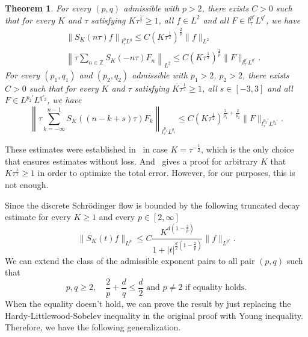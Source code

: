 \documentclass[10pt,a4paper]{article}
\newtheorem{theorem}{Theorem}[section]
\begin{document}
  \begin{theorem}\label{thmDSEold} %
    For every \((p,q)\) admissible with \(p>2\), there exists \(C>0\) such that
    for every \(K\) and \(\tau\) satisfying \(K\tau^\frac12 \geq 1\), all \(
    f \in L^2 \) and all \(F \in l^{p'}_\tau L^{q'}\), we have 
    \begin{eqnarray}
      \label{To} & & \left\| S_{K}(n \tau) f\right\|_{l^p_\tau L^q} \leq C(K\tau^\frac12)^{\frac2p} \|f\|_{L^2} \\
      \label{T*o} & & \left\| \tau\sum_{n \in \mathbb{Z}}  S_K (-n\tau) F_n \right\|_{L^2} \leq C (K\tau^\frac12)^\frac2p \|F\|_{l^{p'}_\tau L^{q'}}.
    \end{eqnarray}
    For every \((p_1, q_1)\) and \((p_2, q_2)\) admissible with \(p_1>2\),
    \(p_2>2\), there exists \(C > 0\) such that for every \(K\) and \(\tau\) 
    satisfying \(K\tau^\frac12 \geq 1\), all \( s \in [-3,3] \) and all 
    \(F \in L^{p_2'} L^{q'_2}\), we have
    \begin{equation}\label{TT*o}
      \left\| \tau \sum_{k = -\infty}^{n-1}  S_K ((n-k+s)\tau) F_k \right\|_{l^{p_1}_\tau L^{q_1}}
      \leq C (K\tau^\frac12)^{ \frac2{p_1} + \frac2{p_2} }  \|F\|_{l^{p_2'}_\tau L^{q_2'}}.
    \end{equation}
  \end{theorem}

  These estimates were established in~\cite{IgZz09} 
  in case \(K=\tau^{-\frac12}\), which is the only choice that ensures estimates 
  without loss. And~\cite{ORS21} gives a proof for arbitrary \(K\) that \(K\tau^\frac12 \geq 1\) 
  in order to optimize the total error. However, for our purposes, this is not enough.

  Since the discrete Schr\"odinger flow is bounded by the following truncated
  decay estimate for every \(K\geq 1\) and every \(p \in [2,\infty]\)
  \[
    \|S_K(t)f\|_{L^p} \leq C \frac{K^{d(1-\frac2p)}}{1+|t|^{\frac{d}2(1-\frac2p)}} \|f\|_{L^{p'}}.
  \]
  We can extend the class of the admissible exponent pairs to all pair \((p,q)\)
  such that 
  \begin{equation}\label{weakly-admissible}
    p,q \geq 2 ,\quad \frac2p + \frac{d}q \leq \frac{d}2 \text{ and } p \neq 2 \text{ if
    equality holds.}
  \end{equation}
  When the equality doesn't hold, we can prove the result by just replacing the 
  Hardy-Littlewood-Sobelev inequality in the original proof with Young inequality. 
  Therefore, we have the following generalization.
\end{document}
